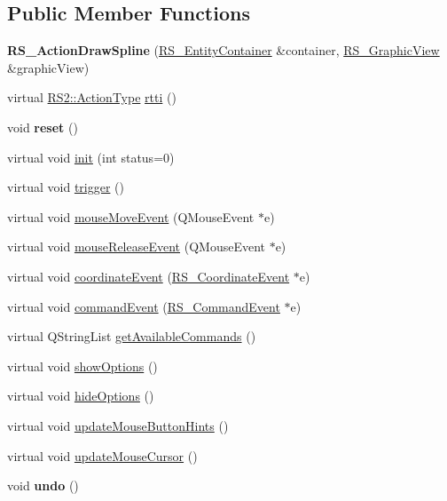 \subsection*{Public Member Functions}
\begin{DoxyCompactItemize}
\item 
\hypertarget{classRS__ActionDrawSpline_ae52f190c0aaee510115ecc5604e9c6fd}{{\bfseries R\-S\-\_\-\-Action\-Draw\-Spline} (\hyperlink{classRS__EntityContainer}{R\-S\-\_\-\-Entity\-Container} \&container, \hyperlink{classRS__GraphicView}{R\-S\-\_\-\-Graphic\-View} \&graphic\-View)}\label{classRS__ActionDrawSpline_ae52f190c0aaee510115ecc5604e9c6fd}

\item 
virtual \hyperlink{classRS2_afe3523e0bc41fd637b892321cfc4b9d7}{R\-S2\-::\-Action\-Type} \hyperlink{classRS__ActionDrawSpline_a773a3c945f9cf80ce645dece7d1317a0}{rtti} ()
\item 
\hypertarget{classRS__ActionDrawSpline_a76a13c6552166c9da0cefcb0d3f4fc73}{void {\bfseries reset} ()}\label{classRS__ActionDrawSpline_a76a13c6552166c9da0cefcb0d3f4fc73}

\item 
virtual void \hyperlink{classRS__ActionDrawSpline_a56c09df61d6d9a66dcc49f591918663a}{init} (int status=0)
\item 
virtual void \hyperlink{classRS__ActionDrawSpline_aa1f85d43f04a3a01085d9c5b2c535734}{trigger} ()
\item 
virtual void \hyperlink{classRS__ActionDrawSpline_a0470b5a0ef8e933af04338e5ba249623}{mouse\-Move\-Event} (Q\-Mouse\-Event $\ast$e)
\item 
virtual void \hyperlink{classRS__ActionDrawSpline_af72f71d6387b0da45b9ee1c125a7271e}{mouse\-Release\-Event} (Q\-Mouse\-Event $\ast$e)
\item 
virtual void \hyperlink{classRS__ActionDrawSpline_a28a936df7a9e5f021ecf6b34ad2fff23}{coordinate\-Event} (\hyperlink{classRS__CoordinateEvent}{R\-S\-\_\-\-Coordinate\-Event} $\ast$e)
\item 
virtual void \hyperlink{classRS__ActionDrawSpline_a9797c1f4126617e7b97c1434e47b9816}{command\-Event} (\hyperlink{classRS__CommandEvent}{R\-S\-\_\-\-Command\-Event} $\ast$e)
\item 
virtual Q\-String\-List \hyperlink{classRS__ActionDrawSpline_a27ae865d85eaccaee5c45d19ae619b1e}{get\-Available\-Commands} ()
\item 
virtual void \hyperlink{classRS__ActionDrawSpline_a66eb3d20128aed029534722dacfef71d}{show\-Options} ()
\item 
virtual void \hyperlink{classRS__ActionDrawSpline_ae10723e6e8e1fad1fe76f828f2fc7344}{hide\-Options} ()
\item 
virtual void \hyperlink{classRS__ActionDrawSpline_a0fb946d4073baaaca11f7e5843d0b8ad}{update\-Mouse\-Button\-Hints} ()
\item 
virtual void \hyperlink{classRS__ActionDrawSpline_a3a217893cb7a70647815c048f2371bc4}{update\-Mouse\-Cursor} ()
\item 
\hypertarget{classRS__ActionDrawSpline_ad4e4843f67184228d8aa7c910449e317}{void {\bfseries undo} ()}\label{classRS__ActionDrawSpline_ad4e4843f67184228d8aa7c910449e317}


\end{DoxyCompactItemize}
